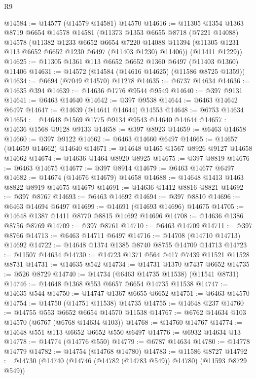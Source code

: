 \begin{lexlean}{R9}
\begin{coremodule}
{{{{{{{{{{{{{{{{{{{{{{{{{{{{{{{{{{{{{{{{{{{{{{{{{{{{{{{{{{{{{{{{{{{{{{{{{{{{{{{{{{{{@14584 := @14577 (@14579 @14581) @14570
@14616 := @11305
    @1354
    @1363
    @8719
    @6654
    @14578
    @14581
    (@11373
      @1353
      @6655
      @8718
      (@7221 @14088)
      @14578
      (@11382
        @1233
        @6652
        @6654
        @7220
        @14088
        @11394
        (@11305 @1231 @113 @6652 @6652 @1230 @6497 (@11403 @1230) @11406))
      (@11411 @1229))
@14625 := @11305 @1361 @113 @6652 @6652 @1360 @6497 (@11403 @1360) @11406
@14631 := @14572 (@14584 (@14616 @14625) (@11586 @8725 @1359))
@14634 := @6694 (@7049 @14570) @11278
@14635 := @6737 @14634
@14636 := @14635 @394
@14639 := @14636 @1776 @9544 @9549
@14640 := @397 @9131
@14641 := @6463 @14640
@14642 := @397 @9538
@14644 := @6463 @14642 @6497
@14647 := @14639 (@14641 @14644) @14553
@14648 := @6753 @14634
@14654 := @14648 @1569 @1775 @9134 @9543 @14640 @14644
@14657 := @14636 @1568 @9128 @9133
@14658 := @397 @8923
@14659 := @6463 @14658
@14660 := @397 @9122
@14662 := @6463 @14660 @6497
@14665 := @14657 (@14659 @14662) @14640
@14671 := @14648 @1465 @1567 @8926 @9127 @14658 @14662
@14674 := @14636 @1464 @8920 @8925
@14675 := @397 @8819
@14676 := @6463 @14675
@14677 := @397 @8914
@14679 := @6463 @14677 @6497
@14682 := @14674 (@14676 @14679) @14658
@14688 := @14648 @1413 @1463 @8822 @8919 @14675 @14679
@14691 := @14636 @1412 @8816 @8821
@14692 := @397 @8767
@14693 := @6463 @14692
@14694 := @397 @8810
@14696 := @6463 @14694 @6497
@14699 := @14691 (@14693 @14696) @14675
@14705 := @14648 @1387 @1411 @8770 @8815 @14692 @14696
@14708 := @14636 @1386 @8756 @8769
@14709 := @397 @8761
@14710 := @6463 @14709
@14711 := @397 @8766
@14713 := @6463 @14711 @6497
@14716 := @14708 (@14710 @14713) @14692
@14722 := @14648 @1374 @1385 @8740 @8755 @14709 @14713
@14723 := @11507 @14634
@14730 := @14723 @1371 @564 @417 @7439 @11521 @11528 @8731
@14731 := @14635 @542
@14734 := @14731 @1370 @7437 @6652
@14735 := @526 @8729
@14740 := @14734 (@6463 @14735 @11538) (@11541 @8731)
@14746 := @14648 @1368 @553 @6657 @6654 @14735 @11538
@14747 := @14635 @544
@14750 := @14747 @1367 @6655 @6652
@14751 := @6463 @14570
@14754 := @14750 (@14751 @11538) @14735
@14755 := @14648 @237
@14760 := @14755 @553 @6652 @6654 @14570 @11538
@14767 := @6762 @14634 @103 @14570 (@6767 (@6768 @14634 @103))
@14768 := @14760 @14767
@14774 := @14648 @551 @113 @6652 @6652 @550 @6497
@14776 := @6932 @14634 @13
@14778 := @14774 (@14776 @550)
@14779 := @6787 @14634
@14780 := @14778 @14779
@14782 := @14754 (@14768 @14780)
@14783 := @11586 @8727
@14792 := @14730 (@14740 (@14746 (@14782 (@14783 @549)) @14780) (@11593 @8729 @549))
}}}}}}}}}}}}}}}}}}}}}}}}}}}}}}}}}}}}}}}}}}}}}}}}}}}}}}}}}}}}}}}}}}}}}}}}}}}}}}}}}}}}
\end{coremodule}
\end{lexlean}
